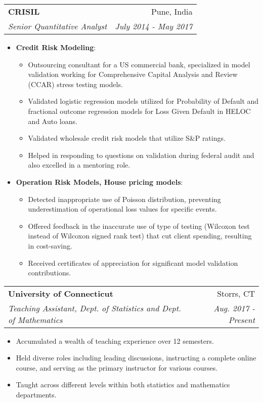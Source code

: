 \documentclass[letterpaper,11pt]{article}
\makeatletter
\newcommand{\resumeSubheading}[4]{
  \vspace{-1pt}\item
    \begin{tabular*}{0.97\textwidth}{l@{\extracolsep{\fill}}r}
      \textbf{#1} & #2 \\
      \textit{\small#3} & \textit{\small #4} \\
    \end{tabular*}\vspace{-5pt}
}
\makeatother
\begin{document}
    \resumeSubheading
      {CRISIL}{Pune, India}
      {Senior Quantitative Analyst}{July 2014 - May 2017}
      \begin{itemize}
        \item \textbf{Credit Risk Modeling}:
        \begin{itemize}
            \item  Outsourcing consultant for a US commercial bank,
        specialized in model validation working for Comprehensive
        Capital Analysis and Review (CCAR) stress testing models.
            \item Validated logistic regression models utilized for Probability
        of Default and fractional outcome regression models for Loss
        Given Default in HELOC and Auto loans. 
            \item Validated wholesale credit risk models that utilize S\&P ratings.
            \item Helped in responding to questions on validation
            during federal audit and also excelled in a mentoring role.
        \end{itemize}\vspace{-5pt}
        
        \item \textbf{Operation Risk Models, House pricing models}: 
        \begin{itemize}
            \item Detected inappropriate use of Poisson distribution,
            preventing underestimation of operational loss values for
            specific events.
            \item Offered feedback in the inaccurate use of type of
            testing (Wilcoxon test instead of Wilcoxon signed rank
            test) that cut client spending, resulting in cost-saving.
            \item Received certificates of appreciation for significant model validation contributions.
        \end{itemize}\vspace{-5pt}
      
    \end{itemize}

    \resumeSubheading
    {University of Connecticut}{Storrs, CT}
    {Teaching Assistant, Dept. of Statistics and Dept. of Mathematics}{Aug. 2017 - Present}
      \begin{itemize}
          \item Accumulated a wealth of teaching experience over 12 semesters.
          \item Held diverse roles including leading discussions,
          instructing a complete online course, and serving as the primary instructor for various courses.
          \item Taught across different levels within both statistics and mathematics departments.
      \end{itemize}
\end{document}
